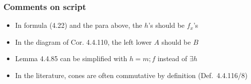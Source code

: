 \documentclass[handout]{beamer}
\begin{document}
\frame
  {   
    \frametitle{Comments on script}\label{Ch4:comments}

 \begin{itemize}[<+->]
\item In formula (4.22) and the para above, the $h$'s should be $f_x$'s
\item In the diagram of Cor. 4.4.110, the left lower $A$ should be $B$
\item Lemma 4.4.85 can be simplified with $h = m;f$ instead of $\exists h$
\item In the literature, cones are often commutative by definition (Def.\ 4.4.116/8)
 \end{itemize}

 }
\end{document}
